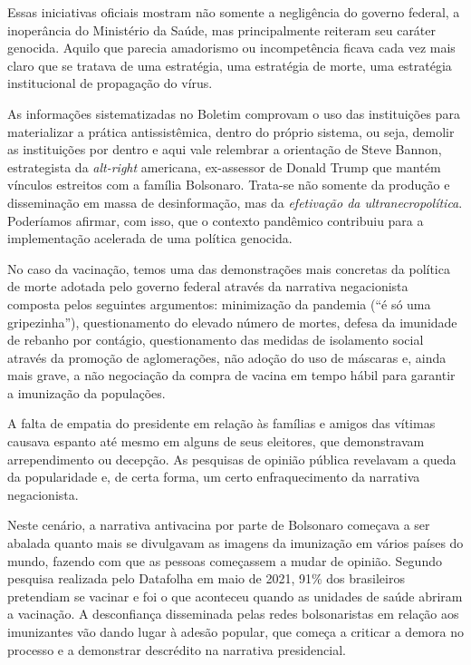 Essas iniciativas oficiais mostram não somente a negligência do governo
federal, a inoperância do Ministério da Saúde, mas principalmente
reiteram seu caráter genocida. Aquilo que parecia amadorismo ou
incompetência ficava cada vez mais claro que se tratava de uma
estratégia, uma estratégia de morte, uma estratégia institucional de
propagação do vírus.

As informações sistematizadas no Boletim comprovam o uso das
instituições para materializar a prática antissistêmica, dentro do
próprio sistema, ou seja, demolir as instituições por dentro e aqui vale
relembrar a orientação de Steve Bannon, estrategista da \textit{\textit{alt-right}}
americana, ex-assessor de Donald Trump que mantém vínculos estreitos com
a família Bolsonaro. Trata-se não somente da produção e disseminação em
massa de desinformação, mas da \textit{efetivação da ultranecropolítica}. Poderíamos
afirmar, com isso, que o contexto pandêmico contribuiu para a implementação
acelerada de uma política genocida.

No caso da vacinação, temos uma das demonstrações mais concretas da
política de morte adotada pelo governo federal através da narrativa
negacionista composta pelos seguintes argumentos: minimização da
pandemia (``é só uma gripezinha''), questionamento do elevado número de
mortes, defesa da imunidade de rebanho por contágio, questionamento das
medidas de isolamento social através da promoção de aglomerações, não
adoção do uso de máscaras e, ainda mais grave, a não negociação da compra de
vacina em tempo hábil para garantir a imunização da populações.

A falta de empatia do presidente em relação às famílias e amigos das
vítimas causava espanto até mesmo em alguns de seus eleitores, que demonstravam
arrependimento ou decepção. As pesquisas de
opinião pública revelavam a queda da popularidade e, de certa forma, um
certo enfraquecimento da narrativa negacionista.

Neste cenário, a narrativa antivacina por parte de Bolsonaro começava a
ser abalada quanto mais se divulgavam as imagens da imunização em vários
países do mundo, fazendo com que as pessoas começassem a mudar de
opinião. Segundo pesquisa realizada pelo Datafolha em maio de 2021, 91\%
dos brasileiros pretendiam se vacinar e foi o que aconteceu quando as
unidades de saúde abriram a vacinação. A desconfiança disseminada pelas
redes bolsonaristas em relação aos imunizantes vão dando lugar à adesão
popular, que começa a criticar a demora no processo e a
demonstrar descrédito na narrativa presidencial.


